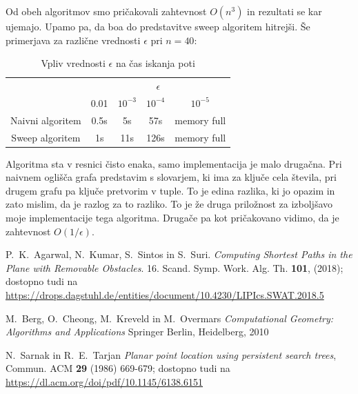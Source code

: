 \documentclass{article}
\begin{document}
Od obeh algoritmov smo pričakovali zahtevnost $O(n^3)$ in rezultati se kar ujemajo. Upamo pa, da boa do predstavitve sweep algoritem hitrejši. Še primerjava za različne vrednosti $\epsilon$ pri $n=40$:

\begin{table}[h]
    \centering
    \begin{tabular}{|c|c|c|c|c|}
        \hline
        & \multicolumn{4}{c|}{$\epsilon$} \\
        \cline{2-5}
        & 0.01 & $10^{-3}$ & $10^{-4}$ & $10^{-5}$ \\
        \hline
        Naivni algoritem & 0.5s & 5s &  57s & memory full \\
        \hline
        Sweep algoritem & 1s & 11s & 126s  &  memory full \\
        \hline
    \end{tabular}
    \caption{Vpliv vrednosti $\epsilon$ na čas iskanja poti}
    \label{tab:2}
\end{table}

Algoritma sta v resnici čisto enaka, samo implementacija je malo drugačna. Pri naivnem oglišča grafa predstavim s slovarjem, ki ima za ključe cela števila, pri drugem grafu pa ključe pretvorim v tuple. To je edina razlika, ki jo opazim in zato mislim, da je razlog za to razliko. To je že druga priložnost za izboljšavo moje implementacije tega algoritma. Drugače pa kot pričakovano vidimo, da je zahtevnost $O(1/\epsilon)$.


\begin{thebibliography}{99}

     P.~K.~Agarwal, N.~Kumar, S.~Sintos in S.~Suri. \emph{Computing Shortest Paths in the Plane with Removable Obstacles}. 16. Scand. Symp. Work. Alg. Th. \textbf{101}, (2018);
    dostopno tudi na \url{https://drops.dagstuhl.de/entities/document/10.4230/LIPIcs.SWAT.2018.5}


     M.~Berg, O.~Cheong, M.~Kreveld in  M.~Overmars \emph{Computational Geometry: Algorithms and Applications} Springer Berlin, Heidelberg, 2010

     N.~Sarnak in R.~E.~Tarjan \emph{Planar point location using persistent search trees}, Commun. ACM \textbf{29} (1986) 669-679; dostopno tudi na \url{https://dl.acm.org/doi/pdf/10.1145/6138.6151}

\end{thebibliography}
\end{document}
